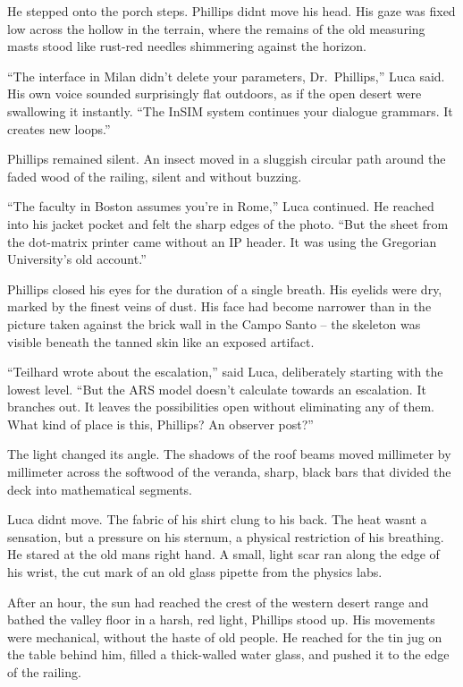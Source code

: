 \documentclass[
  ngerman,
]{article}
\begin{document}
He stepped onto the porch steps. Phillips didn\textquotesingle t move
his head. His gaze was fixed low across the hollow in the terrain, where
the remains of the old measuring masts stood like rust-red needles
shimmering against the horizon.

``The interface in Milan didn't delete your parameters, Dr.~Phillips,''
Luca said. His own voice sounded surprisingly flat outdoors, as if the
open desert were swallowing it instantly. ``The InSIM system continues
your dialogue grammars. It creates new loops.''

Phillips remained silent. An insect moved in a sluggish circular path
around the faded wood of the railing, silent and without buzzing.

``The faculty in Boston assumes you're in Rome,'' Luca continued. He
reached into his jacket pocket and felt the sharp edges of the photo.
``But the sheet from the dot-matrix printer came without an IP header.
It was using the Gregorian University's old account.''

Phillips closed his eyes for the duration of a single breath. His
eyelids were dry, marked by the finest veins of dust. His face had
become narrower than in the picture taken against the brick wall in the
Campo Santo -- the skeleton was visible beneath the tanned skin like an
exposed artifact.

``Teilhard wrote about the escalation,'' said Luca, deliberately
starting with the lowest level. ``But the ARS model doesn't calculate
towards an escalation. It branches out. It leaves the possibilities open
without eliminating any of them. What kind of place is this, Phillips?
An observer post?''

The light changed its angle. The shadows of the roof beams moved
millimeter by millimeter across the softwood of the veranda, sharp,
black bars that divided the deck into mathematical segments.

Luca didn\textquotesingle t move. The fabric of his shirt clung to his
back. The heat wasn\textquotesingle t a sensation, but a pressure on his
sternum, a physical restriction of his breathing. He stared at the old
man\textquotesingle s right hand. A small, light scar ran along the edge
of his wrist, the cut mark of an old glass pipette from the physics
labs.

After an hour, the sun had reached the crest of the western desert range
and bathed the valley floor in a harsh, red light, Phillips stood up.
His movements were mechanical, without the haste of old people. He
reached for the tin jug on the table behind him, filled a thick-walled
water glass, and pushed it to the edge of the railing.
\end{document}
